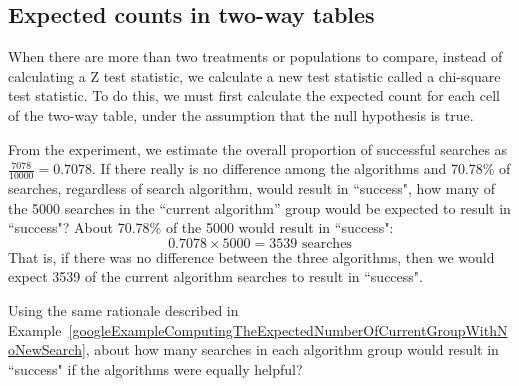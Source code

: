 \D{\newpage}

\subsection{Expected counts in two-way tables}

When there are more than two treatments or populations to compare, instead of calculating a Z test statistic, we calculate a new test statistic called a chi-square test statistic.  To do this, we must first calculate the expected count for each cell of the two-way table, under the assumption that the null hypothesis is true.

\begin{examplewrap}
\begin{nexample}{From the experiment, we estimate the overall proportion of successful searches as $\frac{7078}{10000} = 0.7078$. If there really is no difference among the algorithms and 70.78\% of searches, regardless of search algorithm, would result in ``success", how many of the 5000 searches in the ``current algorithm'' group would be expected to result in ``success"?} \label{googleExampleComputingTheExpectedNumberOfCurrentGroupWithNoNewSearch}
About 70.78\% of the 5000 would result in ``success":
$$ 0.7078\times 5000 = 3539\text{ searches} $$
That is, if there was no difference between the three algorithms, then we would expect 3539 of the current algorithm searches to result in ``success".
\end{nexample}
\end{examplewrap}

\begin{exercisewrap}
\begin{nexercise}\label{googleExampleComputingTheExpectedNumberOfNewAlgGroupWithNoNewSearch}
Using the same rationale described in Example~\ref{googleExampleComputingTheExpectedNumberOfCurrentGroupWithNoNewSearch}, about how many searches in each algorithm group would result in ``success" if the algorithms were equally helpful?\footnotemark
\end{nexercise}
\end{exercisewrap}

